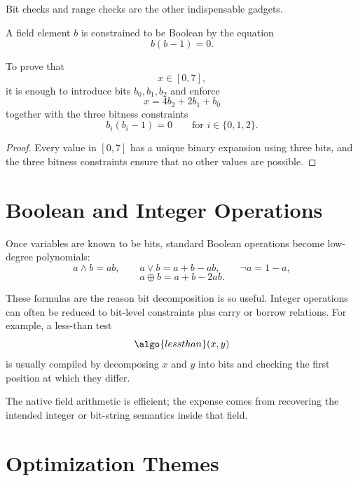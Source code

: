 \documentclass[11pt]{article}
\begin{document}
Bit checks and range checks are the other indispensable gadgets.

\begin{definition}
A field element $b$ is constrained to be Boolean by the equation
\[
  b(b-1)=0.
\]
\end{definition}

\begin{proposition}
To prove that
\[
  x \in [0,7],
\]
it is enough to introduce bits $b_0,b_1,b_2$ and enforce
\[
  x = 4b_2 + 2b_1 + b_0
\]
together with the three bitness constraints
\[
  b_i(b_i-1)=0
  \qquad\text{for } i \in \{0,1,2\}.
\]
\end{proposition}

\begin{proof}
Every value in $[0,7]$ has a unique binary expansion using three bits, and the
three bitness constraints ensure that no other values are possible.
\end{proof}

\section{Boolean and Integer Operations}

Once variables are known to be bits, standard Boolean operations become
low-degree polynomials:
\[
  a \land b = ab,
  \qquad
  a \lor b = a + b - ab,
  \qquad
  \lnot a = 1-a,
\]
\[
  a \oplus b = a + b - 2ab.
\]

These formulas are the reason bit decomposition is so useful.  Integer
operations can often be reduced to bit-level constraints plus carry or borrow
relations.  For example, a less-than test
\[
  \algo{lessthan}(x,y)
\]
is usually compiled by decomposing $x$ and $y$ into bits and checking the first
position at which they differ.

\begin{remark}
The native field arithmetic is efficient; the expense comes from recovering the
intended integer or bit-string semantics inside that field.
\end{remark}

\section{Optimization Themes}
\end{document}
